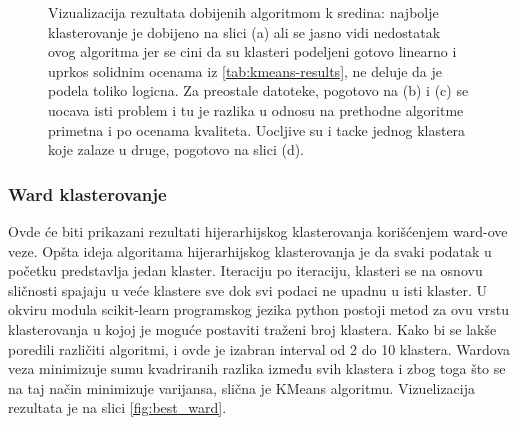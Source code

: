 \documentclass{article}
\begin{document}
\begin{figure}[!h]
    \centering
    \caption{ Vizualizacija rezultata dobijenih algoritmom k sredina: najbolje klasterovanje je dobijeno na slici (a) ali se jasno vidi nedostatak ovog algoritma jer se cini da su klasteri podeljeni gotovo linearno i uprkos solidnim ocenama iz \ref{tab:kmeans-results}, ne deluje da je podela toliko logicna. Za preostale datoteke, pogotovo na (b) i (c) se uocava isti problem i tu je razlika u odnosu na prethodne algoritme primetna i po ocenama kvaliteta. Uocljive su i tacke jednog klastera koje zalaze u druge, pogotovo na slici (d). }
    \label{fig:best_kmeans}
\end{figure}


\subsubsection{Ward klasterovanje}

Ovde će biti prikazani rezultati hijerarhijskog klasterovanja korišćenjem ward-ove veze. Opšta ideja algoritama hijerarhijskog klasterovanja je da svaki podatak u početku predstavlja jedan klaster. Iteraciju po iteraciju, klasteri se na osnovu sličnosti spajaju u veće klastere sve dok svi podaci ne upadnu u isti klaster. U okviru modula scikit-learn programskog jezika python postoji metod za ovu vrstu klasterovanja u kojoj je moguće postaviti traženi broj klastera. Kako bi se lakše poredili različiti algoritmi, i ovde je izabran interval od 2 do 10 klastera. Wardova veza minimizuje sumu kvadriranih razlika između svih klastera i zbog toga što se na taj način minimizuje varijansa, slična je KMeans algoritmu. Vizuelizacija rezultata je na slici \ref{fig:best_ward}.
\end{document}
